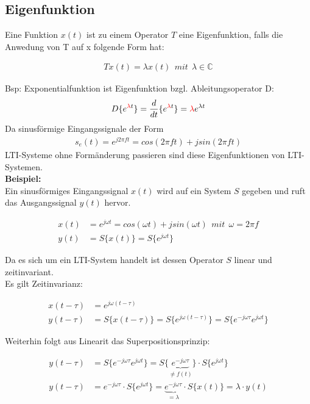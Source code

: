 \documentclass[10pt,a4paper]{article}
\begin{document}
  \subsection{Eigenfunktion}
  Eine Funktion $x(t)$ ist zu einem Operator $T$ eine Eigenfunktion, falls die Anwedung von T auf x folgende Form hat:
  \begin{mdframed}[style=exercise]
    \begin{align}
        Tx(t) = \lambda x(t) \ \ mit \ \ \lambda \in \mathbb{C}
    \end{align}
  \end{mdframed}
  Bsp: Exponentialfunktion ist Eigenfunktion bzgl. Ableitungsoperator D:
    \begin{align*}
        D\{e^{\textcolor{red}\lambda t}\} = \frac{d}{dt}\{e^{\textcolor{red}\lambda t}\} = \textcolor{red} \lambda e^{\lambda t}
    \end{align*}
  Da sinusförmige Eingangssignale der Form 
    \begin{align*}
        s_e(t) = e^{j2\pi ft} = cos(2\pi ft) + j sin (2\pi ft)
    \end{align*}
  LTI-Systeme ohne Formänderung passieren sind diese Eigenfunktionen von LTI-Systemen.\\
  \textbf{Beispiel:}\\
  Ein sinusförmiges Eingangssignal $x(t)$ wird auf ein System $S$ gegeben und ruft das Ausgangssignal $y(t)$ hervor.
  \begin{mdframed}[style=exercise]
    \begin{align*}
        x(t) &= e^{j\omega t} = cos(\omega t) + j sin (\omega t) \ \ mit \ \ \omega = 2\pi f\\
        y(t) &= S\{x(t)\} = S\{e^{j\omega t}\} 
    \end{align*}
  \end{mdframed}
  Da es sich um ein LTI-System handelt ist dessen Operator $S$ linear und zeitinvariant.\\ 
  Es gilt Zeitinvarianz:
  \begin{mdframed}[style=exercise]
    \begin{align*}
        x(t-\tau) &= e^{j\omega (t-\tau)}\\
        y(t-\tau) &= S\{x(t-\tau)\} = S\{e^{j\omega (t-\tau)}\} = S\{e^{-j\omega\tau} e^{j\omega t}\}
    \end{align*}
  \end{mdframed}
  Weiterhin folgt aus Linearit das Superpositionsprinzip:
  \begin{mdframed}[style=exercise]
    \begin{align*}
        y(t-\tau) &= S\{e^{-j\omega\tau} e^{j\omega t}\} = S\{ \underbrace{e^{-j\omega\tau}}_{ \ne f(t) }  \} \cdot S\{e^{j\omega t}\} \\
        y(t-\tau) &= e^{-j\omega\tau} \cdot S\{e^{j\omega t}\} = \underbrace{e^{-j\omega\tau}}_{ = \lambda } \cdot S\{x(t) \} = \lambda \cdot y(t)
    \end{align*}
  \end{mdframed}
\end{document}
